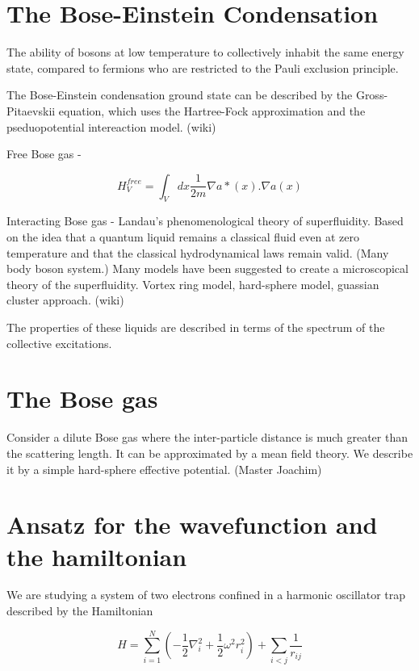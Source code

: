 \section{The Bose-Einstein Condensation}
The ability of bosons at low temperature to collectively inhabit the same energy state, compared to fermions who are restricted to the Pauli exclusion principle.

The Bose-Einstein condensation ground state can be described by the Gross-Pitaevskii equation, which uses the Hartree-Fock approximation and the pseduopotential intereaction model. (wiki) 

Free Bose gas - 

\begin{equation} \label{eq:hamilt_free_bose_gas}
H^{free}_V = \int_V dx \frac{1}{2m} \nabla a*(x). \nabla a(x)
\end{equation}

Interacting Bose gas - Landau's phenomenological theory of superfluidity. Based on the idea that a quantum liquid remains a classical fluid even at zero temperature  and that the classical hydrodynamical laws remain valid. (Many body boson system.) 
Many models have been suggested to create a microscopical theory of the superfluidity. Vortex ring model, hard-sphere model, guassian cluster approach. (wiki)

The properties of these liquids are described in terms of the spectrum of the collective excitations.

\section{The Bose gas}
Consider a dilute Bose gas where the inter-particle distance is much greater than the scattering length. It can be approximated by a mean field theory. We describe it by a simple hard-sphere effective potential. (Master Joachim)

\section{Ansatz for the wavefunction and the hamiltonian}
We are studying a system of two electrons confined in a harmonic oscillator trap described by the Hamiltonian 

\begin{equation}\label{eq:hamilt}
\hat{H} = \sum_{i=1}^N \left( - \frac{1}{2} \nabla_i^2 + \frac{1}{2} \omega^2 r_i^2 \right) + \sum_{i<j} \frac{1}{r_{ij}}
\end{equation}

